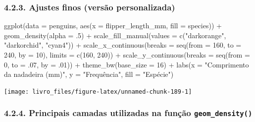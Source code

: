 \documentclass[
]{book}
\newenvironment{Shaded}{\begin{snugshade}}{\end{snugshade}}
\newcommand{\AttributeTok}[1]{\textcolor[rgb]{0.61,0.61,0.61}{#1}}
\newcommand{\DecValTok}[1]{\textcolor[rgb]{0.06,0.06,0.06}{#1}}
\newcommand{\FunctionTok}[1]{\textcolor[rgb]{0,0,0}{#1}}
\newcommand{\NormalTok}[1]{#1}
\newcommand{\SpecialCharTok}[1]{\textcolor[rgb]{0,0,0}{#1}}
\newcommand{\StringTok}[1]{\textcolor[rgb]{0.5,0.5,0.5}{#1}}
\begin{document}
\hypertarget{ajustes-finos-versuxe3o-personalizada-1}{%
\subsubsection{4.2.3. Ajustes finos (versão personalizada)}\label{ajustes-finos-versuxe3o-personalizada-1}}

\begin{Shaded}
\begin{Highlighting}[]
\FunctionTok{ggplot}\NormalTok{(}\AttributeTok{data =}\NormalTok{ penguins, }
       \FunctionTok{aes}\NormalTok{(}\AttributeTok{x =}\NormalTok{ flipper\_length\_mm, }\AttributeTok{fill =}\NormalTok{ species)) }\SpecialCharTok{+}
  \FunctionTok{geom\_density}\NormalTok{(}\AttributeTok{alpha =}\NormalTok{ .}\DecValTok{5}\NormalTok{) }\SpecialCharTok{+}
  \FunctionTok{scale\_fill\_manual}\NormalTok{(}\AttributeTok{values =} \FunctionTok{c}\NormalTok{(}\StringTok{"darkorange"}\NormalTok{, }\StringTok{"darkorchid"}\NormalTok{, }\StringTok{"cyan4"}\NormalTok{)) }\SpecialCharTok{+}
  \FunctionTok{scale\_x\_continuous}\NormalTok{(}\AttributeTok{breaks =} \FunctionTok{seq}\NormalTok{(}\AttributeTok{from =} \DecValTok{160}\NormalTok{, }\AttributeTok{to =} \DecValTok{240}\NormalTok{, }\AttributeTok{by =} \DecValTok{10}\NormalTok{), }\AttributeTok{limits =} \FunctionTok{c}\NormalTok{(}\DecValTok{160}\NormalTok{, }\DecValTok{240}\NormalTok{)) }\SpecialCharTok{+}
  \FunctionTok{scale\_y\_continuous}\NormalTok{(}\AttributeTok{breaks =} \FunctionTok{seq}\NormalTok{(}\AttributeTok{from =} \DecValTok{0}\NormalTok{, }\AttributeTok{to =}\NormalTok{ .}\DecValTok{07}\NormalTok{, }\AttributeTok{by =}\NormalTok{ .}\DecValTok{01}\NormalTok{)) }\SpecialCharTok{+}
  \FunctionTok{theme\_bw}\NormalTok{(}\AttributeTok{base\_size =} \DecValTok{16}\NormalTok{) }\SpecialCharTok{+}
  \FunctionTok{labs}\NormalTok{(}\AttributeTok{x =} \StringTok{"Comprimento da nadadeira (mm)"}\NormalTok{, }\AttributeTok{y =} \StringTok{"Frequência"}\NormalTok{, }\AttributeTok{fill =} \StringTok{"Espécie"}\NormalTok{)}
\end{Highlighting}
\end{Shaded}

\begin{center}\texttt{[image: livro\_files/figure-latex/unnamed-chunk-189-1]} \end{center}

\hypertarget{principais-camadas-utilizadas-na-funuxe7uxe3o-geom_density}{%
\subsubsection{\texorpdfstring{4.2.4. Principais camadas utilizadas na função \texttt{geom\_density()}}{4.2.4. Principais camadas utilizadas na função geom\_density()}}\label{principais-camadas-utilizadas-na-funuxe7uxe3o-geom_density}}
\end{document}
